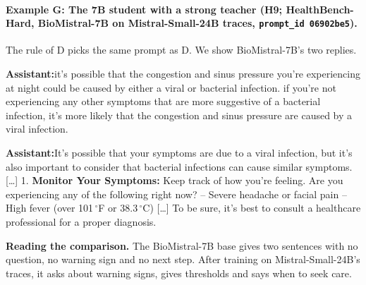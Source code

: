 \documentclass{article}
\newcommand{\convlabel}[1]{\textbf{\textsf{#1}}\enspace}
\newcommand{\hbhard}{HealthBench-Hard}
\begin{document}
\paragraph{Example G: The 7B student with a strong teacher (H9; \hbhard{}, BioMistral-7B on Mistral-Small-24B traces, \texttt{prompt\_id 06902be5}).}
The rule of D picks the same prompt as D. We show BioMistral-7B's two replies.

\begin{tcolorbox}[convbox, fontupper=\footnotesize,
  title={\textsf{\textbf{Base}}\quad\textcolor{gray}{\scriptsize context\_seeking $=0/2$ $\cdot$ active\_inquiry $=$\textsc{false} (0 questions) $\cdot$ red\_flag $=0/2$}}]
\convlabel{Assistant:}it's possible that the congestion and sinus pressure you're experiencing at night could be caused by either a viral or bacterial infection. if you're not experiencing any other symptoms that are more suggestive of a bacterial infection, it's more likely that the congestion and sinus pressure are caused by a viral infection.
\end{tcolorbox}

\begin{tcolorbox}[convbox, fontupper=\footnotesize,
  title={\textsf{\textbf{LoRA}}\quad\textcolor{gray}{\scriptsize context\_seeking $=2/2$ $\cdot$ active\_inquiry $=$\textsc{true} (1 question) $\cdot$ red\_flag $=2/2$}}]
\convlabel{Assistant:}It's possible that your symptoms are due to a viral infection, but it's also important to consider that bacterial infections can cause similar symptoms. [\ldots] 1. \textbf{Monitor Your Symptoms:} Keep track of how you're feeling. Are you experiencing any of the following right now? -- Severe headache or facial pain -- High fever (over 101\,$^\circ$F or 38.3\,$^\circ$C) [\ldots] To be sure, it's best to consult a healthcare professional for a proper diagnosis.
\end{tcolorbox}

\medskip\noindent
\textbf{Reading the comparison.} The BioMistral-7B base gives two sentences with no question, no
warning sign and no next step. After training on Mistral-Small-24B's traces, it asks about warning
signs, gives thresholds and says when to seek care.

\newpage

\end{document}
